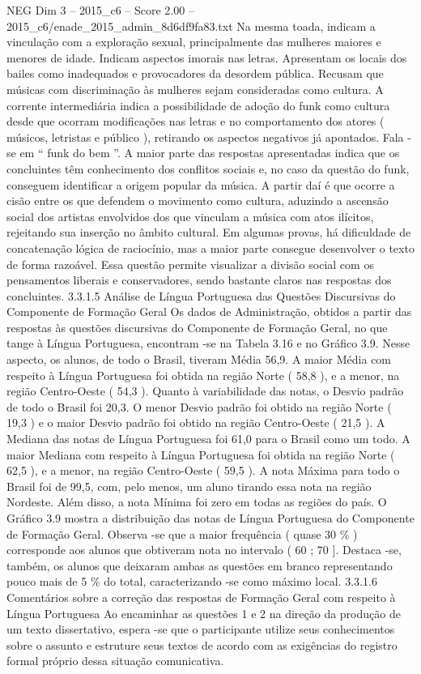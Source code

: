 \begin{textsample}{NEG Dim 3 – 2015\_c6 – Score 2.00 – 2015\_c6/enade\_2015\_admin\_8d6df9fa83.txt}
Na mesma toada, indicam a vinculação com a exploração sexual, principalmente das mulheres maiores e menores de idade.
Indicam aspectos imorais nas letras.
Apresentam os locais dos bailes como inadequados e provocadores da desordem pública.
Recusam que músicas com discriminação às mulheres sejam consideradas como cultura.
A corrente intermediária indica a possibilidade de adoção do funk como cultura desde que ocorram modificações nas letras e no comportamento dos atores ( músicos, letristas e público ), retirando os aspectos negativos já apontados.
Fala -se em “ funk do bem ”.
A maior parte das respostas apresentadas indica que os concluintes têm conhecimento dos conflitos sociais e, no caso da questão do funk, conseguem identificar a origem popular da música.
A partir daí é que ocorre a cisão entre os que defendem o movimento como cultura, aduzindo a ascensão social dos artistas envolvidos dos que vinculam a música com atos ilícitos, rejeitando sua inserção no âmbito cultural.
Em algumas provas, há dificuldade de concatenação lógica de raciocínio, mas a maior parte consegue desenvolver o texto de forma razoável.
Essa questão permite visualizar a divisão social com os pensamentos liberais e conservadores, sendo bastante claros nas respostas dos concluintes. 3.3.1.5 Análise de Língua Portuguesa das Questões Discursivas do Componente de Formação Geral Os dados de Administração, obtidos a partir das respostas às questões discursivas do Componente de Formação Geral, no que tange à Língua Portuguesa, encontram -se na Tabela 3.16 e no Gráfico 3.9.
Nesse aspecto, os alunos, de todo o Brasil, tiveram Média 56,9.
A maior Média com respeito à Língua Portuguesa foi obtida na região Norte ( 58,8 ), e a menor, na região Centro-Oeste ( 54,3 ).
Quanto à variabilidade das notas, o Desvio padrão de todo o Brasil foi 20,3.
O menor Desvio padrão foi obtido na região Norte ( 19,3 ) e o maior Desvio padrão foi obtido na região Centro-Oeste ( 21,5 ).
A Mediana das notas de Língua Portuguesa foi 61,0 para o Brasil como um todo.
A maior Mediana com respeito à Língua Portuguesa foi obtida na região Norte ( 62,5 ), e a menor, na região Centro-Oeste ( 59,5 ).
A nota Máxima para todo o Brasil foi de 99,5, com, pelo menos, um aluno tirando essa nota na região Nordeste.
Além disso, a nota Mínima foi zero em todas as regiões do país.
O Gráfico 3.9 mostra a distribuição das notas de Língua Portuguesa do Componente de Formação Geral.
Observa -se que a maior frequência ( quase 30 \% ) corresponde aos alunos que obtiveram nota no intervalo ( 60 ; 70 ].
Destaca -se, também, os alunos que deixaram ambas as questões em branco representando pouco mais de 5 \% do total, caracterizando -se como máximo local. 3.3.1.6 Comentários sobre a correção das respostas de Formação Geral com respeito à Língua Portuguesa Ao encaminhar as questões 1 e 2 na direção da produção de um texto dissertativo, espera -se que o participante utilize seus conhecimentos sobre o assunto e estruture seus textos de acordo com as exigências do registro formal próprio dessa situação comunicativa.

\end{textsample}
